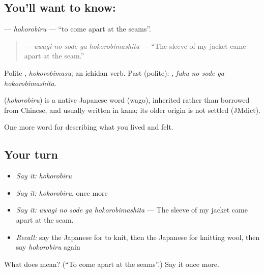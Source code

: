 \subsection*{You'll want to know: }
\textbf{} — \emph{hokorobiru} — \textquotedblleft{}to come apart at the seams\textquotedblright{}.

\begin{quote}
\textbf{  } — \emph{uwagi no sode ga hokorobimashita} — \textquotedblleft{}The sleeve of my jacket came apart at the seam.\textquotedblright{}
\end{quote}

Polite \textbf{}, \emph{hokorobimasu}; an ichidan verb. Past (polite): \textbf{  }, \emph{fuku no sode ga hokorobimashita}.

\begin{cousinweb}
\textbf{} (\emph{hokorobiru}) is a native Japanese word (wago), inherited rather than borrowed from Chinese, and usually written in kana; its older origin is not settled (JMdict).
\end{cousinweb}

\begin{grammarlens}[title={What you've built}]
One more word for describing what you lived and felt.
\end{grammarlens}

\subsection*{Your turn}
\begin{itemize}
\raggedright
  \item \emph{Say it:} \emph{hokorobiru}
  \item \emph{Say it:} \emph{hokorobiru}, once more
  \item \emph{Say it:} \emph{uwagi no sode ga hokorobimashita} — The sleeve of my jacket came apart at the seam.
  \item \emph{Recall:} say the Japanese for to knit, then the Japanese for knitting wool, then say \emph{hokorobiru} again
\end{itemize}

\begin{tcolorbox}[breakable,colback=teal!4,colframe=teal!35!black,title={Before you move on}]
What does  mean? (\textquotedblleft{}To come apart at the seams\textquotedblright{}.) Say it once more.
\end{tcolorbox}
